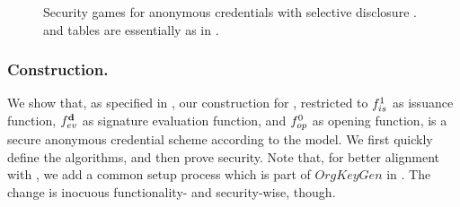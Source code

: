 \begin{figure}[ht!]
  \centering
  \caption{Security games for anonymous credentials with selective disclosure
    \cite{fhs19}. \OWNR and \ATTR tables are essentially as in
    .}
  \label{fig:model-ac}  
\end{figure}

\subsubsection{\CUASAC Construction.} %
We show that, as specified in , our \CUASGen
construction for \UAS, restricted to $f_{is}^1$ as issuance function,
$f_{ev}^{\mathbf{d}}$ as signature evaluation function, and $f_{op}^0$ as opening
function, is a secure anonymous credential scheme according to the \cite{fhs19}
model. We first quickly define the algorithms, and then prove security. Note
that, for better alignment with \UAS, we add a common setup process which is
part of $OrgKeyGen$ in \cite{fhs19}. The change is inocuous functionality- and
security-wise, though.

